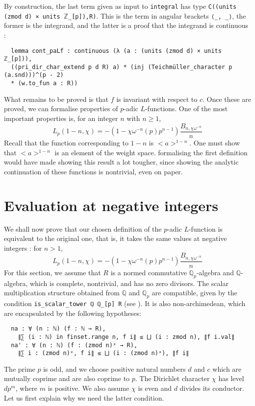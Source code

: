 \documentclass[a4paper,UKenglish,cleveref, autoref, thm-restate]{lipics-v2021}
\newcommand{\lean}[1]{\texttt{#1}\xspace} %
\begin{document}
By construction, the last term given as input to \lean{integral} has type \newline \lean{C((units (zmod d) × units $\mathbb{Z}$\_[p]),R)}. 
This is the term in angular brackets \lean{⟨\_, \_⟩}, the former is the integrand, and the latter is a proof that the integrand is continuous : 

\begin{lstlisting}
  lemma cont_paLf : continuous (λ (a : (units (zmod d) × units ℤ_[p])),
  ((pri_dir_char_extend p d R) a) * (inj (Teichmüller_character p (a.snd)))^(p - 2)
  * (w.to_fun a : R))
\end{lstlisting}

What remains to be proved is that $f$ is invariant with respect to $c$. 
Once these are proved, we can formalise properties of $p$-adic $L$-functions. One of the most
important properties is, for an integer $n$ with $n \ge 1$,
$$ L_p (1 - n, \chi) = -(1 - \chi \omega^{-n}(p)p^{n - 1}) \frac{B_{n, \chi \omega^{-n}}}{n} $$
Recall that the function corresponding to $1 - n$ is $<a>^{1 - n}$. One must show that $<a>^{1 - n}$ is 
an element of the weight space. formalising the first definition would have made showing this result a 
lot tougher, since showing the analytic continuation of these functions is nontrivial, even on paper.

\section{Evaluation at negative integers}
We shall now prove that our chosen definition of the $p$-adic $L$-function is equivalent to the original one, that is, 
it takes the same values at negative integers : for $n > 1$,
$$ L_p (1 - n, \chi) = -(1 - \chi \omega^{-n}(p)p^{n - 1}) \frac{B_{n, \chi \omega^{-n}}}{n} $$
For this section, we assume that $R$ is a normed commutative $\mathbb{Q}_p$-algebra and $\mathbb{Q}$-algebra, 
which is complete, nontrivial, and has no zero divisors. The scalar multiplication structure obtained from $\mathbb{Q}$ 
and $\mathbb{Q}_p$ are compatible, given by the condition \lean{is\_scalar\_tower ℚ ℚ\_[p] R} (see \cite{DD}). It is also non-archimedean, which are encapsulated by the following hypotheses:
\begin{lstlisting}
  na : ∀ (n : ℕ) (f : ℕ → R), 
    ∥∑ (i : ℕ) in finset.range n, f i∥ ≤ ⨆ (i : zmod n), ∥f i.val∥
  na' : ∀ (n : ℕ) (f : (zmod n)ˣ → R), 
    ∥∑ i : (zmod n)ˣ, f i∥ ≤ ⨆ (i : (zmod n)ˣ), ∥f i∥
\end{lstlisting}
The prime $p$ is odd, and we choose positive natural numbers $d$ and $c$ which are mutually coprime and are also coprime to 
$p$. The Dirichlet character $\chi$ has level $d p^m$, where $m$ is positive. We also assume $\chi$ is even and $d$ divides 
its conductor. Let us first explain why we need the latter condition.
\end{document}
